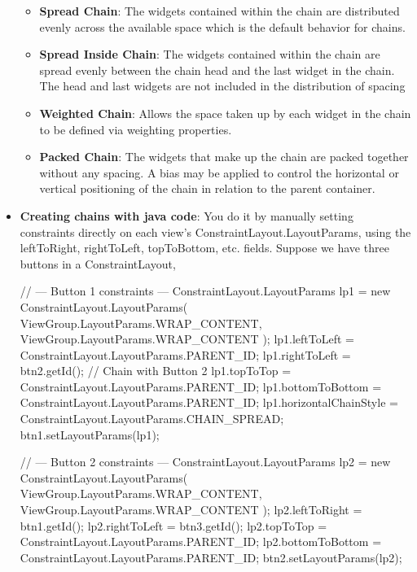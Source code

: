 \documentclass{report}
\begin{document}
\begin{itemize}
\begin{itemize}
                \item \textbf{Spread Chain}: The widgets contained within the chain are distributed evenly across the available space which is the default behavior for chains.
                    \bigbreak \noindent 
                \item \textbf{Spread Inside Chain}: The widgets contained within the chain are spread evenly between the chain head and the last widget in the chain. The head and last widgets are not included in the distribution of spacing
                \item \textbf{Weighted Chain}: Allows the space taken up by each widget in the chain to be defined via weighting properties.
                \item \textbf{Packed Chain}: The widgets that make up the chain are packed together without any spacing. A bias may be applied to control the horizontal or vertical positioning of the chain in relation to the parent container.
            \end{itemize}


        \item \textbf{Creating chains with java code}: You do it by manually setting constraints directly on each view’s ConstraintLayout.LayoutParams, using the leftToRight, rightToLeft, topToBottom, etc. fields.
            \bigbreak \noindent 
            Suppose we have three buttons in a ConstraintLayout, 
            \bigbreak \noindent 
            \begin{javacode}
                // --- Button 1 constraints ---
                ConstraintLayout.LayoutParams lp1 = new ConstraintLayout.LayoutParams(
                        ViewGroup.LayoutParams.WRAP_CONTENT,
                        ViewGroup.LayoutParams.WRAP_CONTENT
                );
                lp1.leftToLeft = ConstraintLayout.LayoutParams.PARENT_ID;
                lp1.rightToLeft = btn2.getId();    // Chain with Button 2
                lp1.topToTop = ConstraintLayout.LayoutParams.PARENT_ID;
                lp1.bottomToBottom = ConstraintLayout.LayoutParams.PARENT_ID;
                lp1.horizontalChainStyle = ConstraintLayout.LayoutParams.CHAIN_SPREAD;
                btn1.setLayoutParams(lp1);

                // --- Button 2 constraints ---
                ConstraintLayout.LayoutParams lp2 = new ConstraintLayout.LayoutParams(
                        ViewGroup.LayoutParams.WRAP_CONTENT,
                        ViewGroup.LayoutParams.WRAP_CONTENT
                );
                lp2.leftToRight = btn1.getId();
                lp2.rightToLeft = btn3.getId();
                lp2.topToTop = ConstraintLayout.LayoutParams.PARENT_ID;
                lp2.bottomToBottom = ConstraintLayout.LayoutParams.PARENT_ID;
                btn2.setLayoutParams(lp2);


\end{javacode}
\end{itemize}
\end{document}

